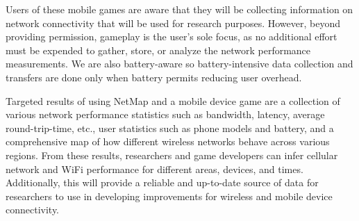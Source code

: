 Users of these mobile games are aware that they will be collecting information on network connectivity that will be used for research purposes. However, beyond providing permission, gameplay is the user's sole focus, as no additional effort must be expended to gather, store, or analyze the network performance measurements. We are also battery-aware so battery-intensive data collection and transfers are done only when battery permits reducing user overhead. 

Targeted results of using NetMap and a mobile device game are a collection of various network performance statistics such as bandwidth, latency, average round-trip-time, etc., user statistics such as phone models and battery, and a comprehensive map of how different wireless networks behave across various regions. From these results, researchers and game developers can infer cellular network and WiFi performance for different areas, devices, and times. Additionally, this will provide a reliable and up-to-date source of data for researchers to use in developing improvements for wireless and mobile device connectivity. 


